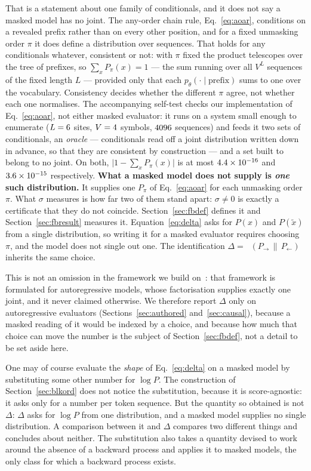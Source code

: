 \documentclass[11pt]{article}
\DeclareMathOperator{\KL}{D_{\mathrm{KL}}}
\begin{document}
That is a statement about one family of conditionals, and it does not say a
masked model has no joint.  The any-order chain rule, Eq.~\eqref{eq:aoar},
conditions on a revealed prefix rather than on every other position, and for
a fixed unmasking order $\pi$ it does define a distribution over sequences.
That holds for any conditionals whatever, consistent or not: with $\pi$
fixed the product telescopes over the tree of prefixes, so $\sum_x
P_\pi(x) = 1$ --- the sum running over all $V^L$ sequences of the fixed
length $L$ --- provided only that each
$p_\theta(\cdot \mid \text{prefix})$ sums to one over the vocabulary.  Consistency decides whether the different
$\pi$ agree, not whether each one normalises.  The accompanying self-test
checks our implementation of Eq.~\eqref{eq:aoar}, not either masked
evaluator: it runs on a system small enough to enumerate ($L = 6$
sites, $V = 4$ symbols, $4096$ sequences) and feeds it two sets
of conditionals, an \emph{oracle} --- conditionals read off a joint
distribution written down in advance, so that they are consistent by
construction --- and a set built to belong to no joint.  On both,
$\bigl|1 - \sum_x P_\pi(x)\bigr|$ is at most $4.4\times10^{-16}$ and
$3.6\times10^{-15}$ respectively.
\textbf{What a masked model does not supply is \emph{one} such
distribution.}  It supplies one $P_\pi$ of Eq.~\eqref{eq:aoar} for each
unmasking order $\pi$.  What $\sigma$ measures is how far two of them stand
apart: $\sigma \neq 0$ is exactly a certificate that they do not coincide.  Section~\ref{sec:fbdef}
defines it and Section~\ref{sec:fbresult} measures it.
Equation~\eqref{eq:delta} asks for $P(x)$ and $P(\tilde{x})$ from a single
distribution, so writing it for a masked evaluator requires choosing $\pi$,
and the model does not single out one.  The identification $\Delta =
\KL(P_{\rightarrow} \,\|\, P_{\leftarrow})$ inherits the same choice.

This is not an omission in the framework we build on~\cite{sagawa2026}: that
framework is formulated for autoregressive models, whose factorisation
supplies exactly one joint, and it never claimed otherwise.  We therefore
report $\Delta$ only on autoregressive evaluators
(Sections~\ref{sec:authored} and~\ref{sec:causal}), because a masked
reading of it would be indexed by a
choice, and because how much that choice can move the number is the subject
of Section~\ref{sec:fbdef}, not a detail to be set aside here.

One may of course evaluate the \emph{shape} of Eq.~\eqref{eq:delta} on a
masked model by substituting some other number for $\log P$.  The
construction of Section~\ref{sec:blkord} does not notice the substitution,
because it is score-agnostic: it asks only for a number per token sequence.  But the
quantity so obtained is not $\Delta$: $\Delta$ asks for $\log P$ from one
distribution, and a masked model supplies no single distribution.  A
comparison between it and $\Delta$ compares two different things and
concludes about neither.  The substitution also takes a quantity devised to
work around the absence of a backward process and applies it to masked
models, the only class for which a backward process exists.
\end{document}
